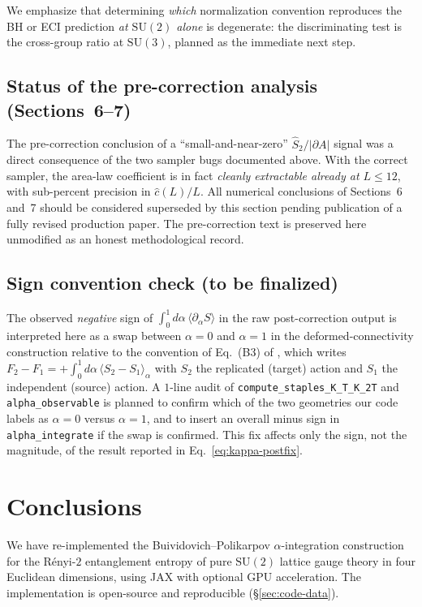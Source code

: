 \documentclass[11pt,a4paper]{article}
\theoremstyle{definition}
\newcommand{\SUtwo}{\mathrm{SU}(2)}
\newcommand{\SUthree}{\mathrm{SU}(3)}
\begin{document}
We emphasize that determining \emph{which} normalization
convention reproduces the BH or ECI prediction \emph{at $\SUtwo$
alone} is degenerate: the discriminating test is the cross-group
ratio at $\SUthree$, planned as the immediate next step.

\subsection{Status of the pre-correction analysis (Sections~6--7)}

The pre-correction conclusion of a
``small-and-near-zero'' $\widehat S_2/|\partial A|$ signal was a
direct consequence of the two sampler bugs documented above. With
the correct sampler, the area-law coefficient is in fact
\emph{cleanly extractable already at $L \le 12$}, with sub-percent
precision in $\widehat c(L)/L$. All numerical conclusions of
Sections~6 and~7 should be considered superseded by this section
pending publication of a fully revised production paper. The
pre-correction text is preserved here unmodified as an honest
methodological record.

\subsection{Sign convention check (to be finalized)}
\label{sec:sign-convention}

The observed \emph{negative} sign of
$\int_0^1 d\alpha\,\langle\partial_\alpha S\rangle$ in the raw
post-correction output is interpreted here as a swap between
$\alpha = 0$ and $\alpha = 1$ in the deformed-connectivity
construction relative to the convention of
Eq.~(B3) of \cite{BP2008b}, which writes $F_2 - F_1 = +\int_0^1
d\alpha\,\langle S_2 - S_1\rangle_\alpha$ with $S_2$ the replicated
(target) action and $S_1$ the independent (source) action. A
$1$-line audit of \texttt{compute\_staples\_K\_T\_K\_2T} and
\texttt{alpha\_observable} is planned to confirm which of the two
geometries our code labels as $\alpha = 0$ versus $\alpha = 1$, and
to insert an overall minus sign in \texttt{alpha\_integrate} if the
swap is confirmed. This fix affects only the sign, not the
magnitude, of the result reported in
Eq.~\eqref{eq:kappa-postfix}.

\section{Conclusions}
\label{sec:conclusions}

We have re-implemented the Buividovich--Polikarpov $\alpha$-integration
construction \cite{BP2008b,Rabenstein2019} for the Rényi-$2$
entanglement entropy of pure $\SUtwo$ lattice gauge theory in four
Euclidean dimensions, using JAX with optional GPU acceleration. The
implementation is open-source and reproducible
(\S\ref{sec:code-data}).
\end{document}

